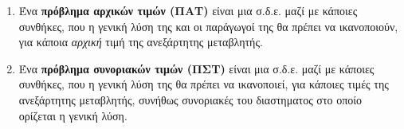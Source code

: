 \begin{dfns}
\begin{enumerate}
\item Ένα \textbf{πρόβλημα αρχικών τιμών (ΠΑΤ)} είναι μια σ.δ.ε. μαζί με κάποιες συνθήκες, που η γενική λύση της και οι παράγωγοί της θα πρέπει να ικανοποιούν, για κάποια \textit{αρχική} τιμή της ανεξάρτητης μεταβλητής.


\item Ένα \textbf{πρόβλημα συνοριακών τιμών (ΠΣΤ)} είναι μια σ.δ.ε. μαζί με κάποιες συνθήκες, που η γενική λύση της θα πρέπει να ικανοποιεί, για κάποιες τιμές της ανεξάρτητης μεταβλητής, συνήθως συνοριακές του διαστηματος στο οποίο ορίζεται η γενική λύση. 
\end{enumerate}
\end{dfns}

















